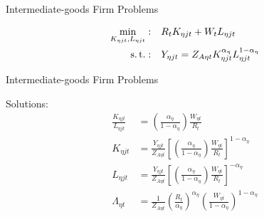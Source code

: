 \documentclass[../quali_slides.tex]{subfiles}
\begin{document}

	\begin{frame}{Intermediate-goods Firm Problems}
		
	\begin{align}
		\label{eq_v2:reg-int-good-firm-total-cost}
		\min_{K_{\eta jt}, L_{\eta jt}}: \quad & R_{t} K_{\eta jt} + W_t L_{\eta jt} \\
		\label{eq_v2:reg-int-good-firm-prod-function}
		\operatorname{s.t.}: \quad & Y_{\eta jt} = Z_{A\eta t} K_{\eta jt}^{\alpha_{\eta}} L_{\eta jt}^{1-{\alpha_{\eta}}}
	\end{align}
				
	\end{frame}


\begin{frame}{Intermediate-goods Firm Problems}

Solutions:
\begin{align}
	\frac{K_{\eta jt}}{L_{\eta jt}} &= \left( \frac{{\alpha_{\eta}}}{1-\alpha_{\eta}} \right) \frac{W_{\eta t}}{R_{t}} \label{eq_v2:reg-int-good-firm-TMRS} \\
	K_{\eta jt} & = \frac{Y_{\eta jt}}{Z_{A\eta t}} \left[ \left( \frac{{\alpha_{\eta}}}{1-\alpha_{\eta}} \right) \frac{W_{\eta t}}{R_{t}}\right]^{1-\alpha_{\eta}} \label{eq_v2:reg-int-good-firm-Kt-demand} \\
	L_{\eta jt} & = \frac{Y_{\eta jt}}{Z_{A\eta t}} \left[ \left( \frac{{\alpha_{\eta}}}{1-\alpha_{\eta}} \right) \frac{W_{\eta t}}{R_{t}}\right]^{-{\alpha_{\eta}}} \label{eq_v2:reg-int-good-firm-Lt-demand} \\
	\Lambda_{\eta t} &= \frac{1}{Z_{A\eta t}} \left( \frac{R_{t}}{{\alpha_{\eta}}} \right)^{{\alpha_{\eta}}} \left( \frac{W_{\eta t}}{1-\alpha_{\eta}} \right)^{1-\alpha_{\eta}} \label{eq_v2:reg-int-good-firm-MC-2}
\end{align}

\end{frame}
\end{document}
